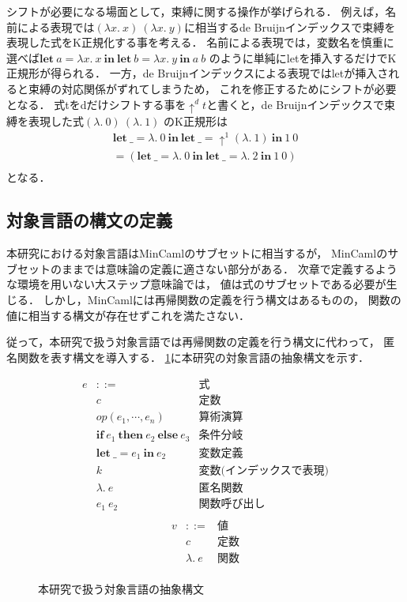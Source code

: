 \documentclass[T]{compsoft}
\newcommand{\keyword}[1]{\mathbf{#1}}
\newcommand{\IF}{\keyword{if}}
\newcommand{\THEN}{\keyword{then}}
\newcommand{\ELSE}{\keyword{else}}
\newcommand{\LET}{\keyword{let}}
\newcommand{\IN}{\keyword{in}}
\begin{document}
シフトが必要になる場面として，束縛に関する操作が挙げられる．
例えば，名前による表現では$(\lambda x.~x)~(\lambda x.~y)$に相当するde Bruijnインデックスで束縛を表現した式をK正規化する事を考える．
名前による表現では，変数名を慎重に選べば$\LET~a = \lambda x.~x~\IN~\LET~b = \lambda x.~y~\IN~a~b$
のように単純にletを挿入するだけでK正規形が得られる．
一方，de Bruijnインデックスによる表現ではletが挿入されると束縛の対応関係がずれてしまうため，
これを修正するためにシフトが必要となる．
式tをdだけシフトする事を$\uparrow^d t$と書くと，de Bruijnインデックスで束縛を表現した式$(\lambda.~0)~(\lambda.~1)$
のK正規形は
\[ 
	\begin{array}{l}
		\LET~\_ = \lambda.~0~\IN~\LET~\_ = \uparrow^1(\lambda.~1)~\IN~1~0 \\
		= (\LET~\_ = \lambda.~0~\IN~\LET~\_ = \lambda.~2~\IN~1~0) \\
	\end{array}
\]
となる．

\subsection{対象言語の構文の定義}
本研究における対象言語はMinCamlのサブセットに相当するが，
MinCamlのサブセットのままでは意味論の定義に適さない部分がある．
次章で定義するような環境を用いない大ステップ意味論では，
値は式のサブセットである必要が生じる．
しかし，MinCamlには再帰関数の定義を行う構文はあるものの，
関数の値に相当する構文が存在せずこれを満たさない．

従って，本研究で扱う対象言語では再帰関数の定義を行う構文に代わって，
匿名関数を表す構文を導入する．
\figurename\ref{eqn:target-language-ast}に本研究の対象言語の抽象構文を示す．

\begin{figure}[htbp]
	\[ \begin{array}{lll}
			e & ::= & \mbox{式} \\
				& c	& \mbox{定数} \\
			 	& \textit{op} (e_1,\cdots,e_n) & \mbox{算術演算} \\
				& \IF~e_1~\THEN~e_2~\ELSE~e_3 & \mbox{条件分岐} \\
			 	& \LET~\_=e_1~\IN~e_2 & \mbox{変数定義} \\
				& k & \mbox{変数(インデックスで表現)} \\
				& \lambda.~e & \mbox{匿名関数} \\
				& e_1~e_2 & \mbox{関数呼び出し} \\
	\end{array} \]
	\[ \begin{array}{lll}
			v & ::= & \mbox{値} \\
				& c	& \mbox{定数} \\
				& \lambda.~e & \mbox{関数} \\
	\end{array} \]
	\caption{本研究で扱う対象言語の抽象構文}
	\label{eqn:target-language-ast}
\end{figure}
\end{document}
